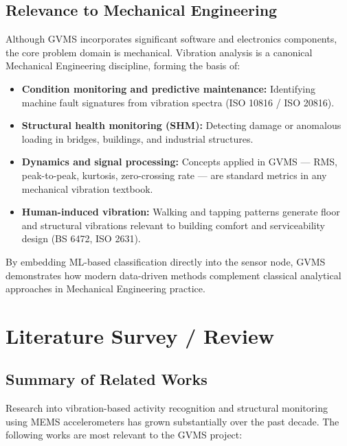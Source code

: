 \documentclass[12pt,a4paper]{report}
\begin{document}
\section{Relevance to Mechanical Engineering}

Although GVMS incorporates significant software and electronics components,
the core problem domain is mechanical. Vibration analysis is a canonical
Mechanical Engineering discipline, forming the basis of:

\begin{itemize}
  \item \textbf{Condition monitoring and predictive maintenance:} Identifying
        machine fault signatures from vibration spectra (ISO 10816 / ISO 20816).
  \item \textbf{Structural health monitoring (SHM):} Detecting damage or
        anomalous loading in bridges, buildings, and industrial structures.
  \item \textbf{Dynamics and signal processing:} Concepts applied in GVMS ---
        RMS, peak-to-peak, kurtosis, zero-crossing rate --- are standard
        metrics in any mechanical vibration textbook.
  \item \textbf{Human-induced vibration:} Walking and tapping patterns
        generate floor and structural vibrations relevant to building comfort
        and serviceability design (BS 6472, ISO 2631).
\end{itemize}

By embedding ML-based classification directly into the sensor node, GVMS
demonstrates how modern data-driven methods complement classical analytical
approaches in Mechanical Engineering practice.

\chapter{Literature Survey / Review}

\section{Summary of Related Works}

Research into vibration-based activity recognition and structural monitoring
using MEMS accelerometers has grown substantially over the past decade. The
following works are most relevant to the GVMS project:
\end{document}
